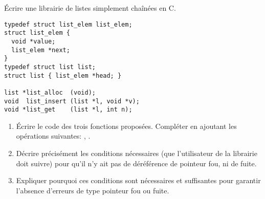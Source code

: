 \begin{Exercise}[title={Gestion mémoire manuelle}]
Écrire une librairie de listes simplement chaînées en C.

\begin{verbatim}
typedef struct list_elem list_elem;
struct list_elem {
  void *value;
  list_elem *next;
}
typedef struct list list;
struct list { list_elem *head; }

list *list_alloc  (void);
void  list_insert (list *l, void *v);
void *list_get    (list *l, int n);
\end{verbatim}

\begin{enumerate}
\item Écrire le code des trois fonctions proposées.  Compléter en ajoutant
  les opérations suivantes: , .

\item Décrire précisément les conditions nécessaires (que l'utilisateur de
  la librairie doit suivre) pour qu'il n'y ait pas de déréférence de
  pointeur fou, ni de fuite.

\item Expliquer pourquoi ces conditions sont nécessaires et suffisantes pour
  garantir l'absence d'erreurs de type pointeur fou ou fuite.
\end{enumerate}
\end{Exercise}